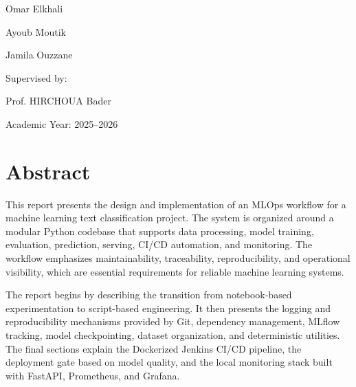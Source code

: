 \documentclass[11pt,a4paper]{article}
\begin{document}
\begin{titlepage}
\begin{minipage}[t]{0.42\textwidth}
        {\small Omar Elkhali}

        \vspace{0.25cm}

        {\small Ayoub Moutik}

        \vspace{0.25cm}

        {\small Jamila Ouzzane}
    \end{minipage}
    \hfill
    \begin{minipage}[t]{0.32\textwidth}
        {\small Supervised by:}

        \vspace{0.35cm}

        {\small Prof. HIRCHOUA Bader}


    \end{minipage}

    \vfill

    \begin{center}
        {\small Academic Year: 2025--2026}
    \end{center}

\end{titlepage}

\tableofcontents
\newpage

\section*{Abstract}

This report presents the design and implementation of an MLOps workflow for a machine learning text classification project. The system is organized around a modular Python codebase that supports data processing, model training, evaluation, prediction, serving, CI/CD automation, and monitoring. The workflow emphasizes maintainability, traceability, reproducibility, and operational visibility, which are essential requirements for reliable machine learning systems.

The report begins by describing the transition from notebook-based experimentation to script-based engineering. It then presents the logging and reproducibility mechanisms provided by Git, dependency management, MLflow tracking, model checkpointing, dataset organization, and deterministic utilities. The final sections explain the Dockerized Jenkins CI/CD pipeline, the deployment gate based on model quality, and the local monitoring stack built with FastAPI, Prometheus, and Grafana.
\end{document}
